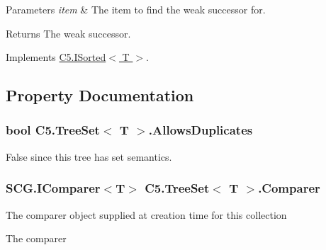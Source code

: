 \begin{DoxyParams}{Parameters}
{\em item} & The item to find the weak successor for.\\
\hline
\end{DoxyParams}
\begin{DoxyReturn}{Returns}
The weak successor.
\end{DoxyReturn}


Implements \hyperlink{interface_c5_1_1_i_sorted_a52c5bf3983dfb2378ec431206d1ee8ce}{C5.\+I\+Sorted$<$ T $>$}.



\subsection{Property Documentation}
\hypertarget{class_c5_1_1_tree_set_aca61596a366f80a108322652c0c29da8}{}
\subsubsection[{Allows\+Duplicates}]{\setlength{\rightskip}{0pt plus 5cm}bool {\bf C5.\+Tree\+Set}$<$ T $>$.Allows\+Duplicates\hspace{0.3cm}{\ttfamily [get]}}\label{class_c5_1_1_tree_set_aca61596a366f80a108322652c0c29da8}




False since this tree has set semantics.\hypertarget{class_c5_1_1_tree_set_aeb1bba55b148bb7263d26fd5f6ad8a16}{}
\subsubsection[{Comparer}]{\setlength{\rightskip}{0pt plus 5cm}S\+C\+G.\+I\+Comparer$<$T$>$ {\bf C5.\+Tree\+Set}$<$ T $>$.Comparer\hspace{0.3cm}{\ttfamily [get]}}\label{class_c5_1_1_tree_set_aeb1bba55b148bb7263d26fd5f6ad8a16}


The comparer object supplied at creation time for this collection 

The comparer\hypertarget{class_c5_1_1_tree_set_a124c0cee22a8f1ae363e9d37a9e5fc0f}{}
